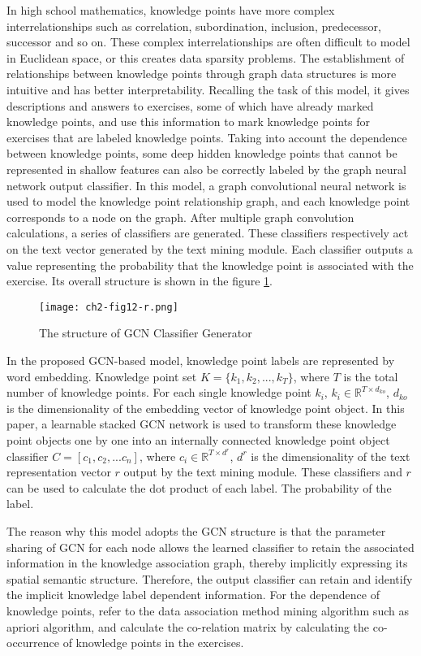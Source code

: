 In high school mathematics, knowledge points have more complex interrelationships such as correlation, subordination, inclusion, predecessor, successor and so on. These complex interrelationships are often difficult to model in Euclidean space, or this creates data sparsity problems. The establishment of relationships between knowledge points through graph data structures is more intuitive and has better interpretability. Recalling the task of this model, it gives descriptions and answers to exercises, some of which have already marked knowledge points, and use this information to mark knowledge points for exercises that are labeled knowledge points. Taking into account the dependence between knowledge points, some deep hidden knowledge points that cannot be represented in shallow features can also be correctly labeled by the graph neural network output classifier. In this model, a graph convolutional neural network is used to model the knowledge point relationship graph, and each knowledge point corresponds to a node on the graph. After multiple graph convolution calculations, a series of classifiers are generated. These classifiers respectively act on the text vector generated by the text mining module. Each classifier outputs a value representing the probability that the knowledge point is associated with the exercise. Its overall structure is shown in the figure \ref{fig:ch2-fig12}.

\begin{figure}[h]
	\centering
	\texttt{[image: ch2-fig12-r.png]}
	\caption{The structure of GCN Classifier Generator}
	\label{fig:ch2-fig12}
\end{figure}

In the proposed GCN-based model, knowledge point labels are represented by word embedding. Knowledge point set $K=\{k_1,k_2,...,k_T\}$, where $T$ is the total number of knowledge points. For each single knowledge point $k_i$, $k_i \in \mathbb{R}^{T\times d_{ko}}$, $d_{ko}$ is the dimensionality of the embedding vector of knowledge point object. In this paper, a learnable stacked GCN network is used to transform these knowledge point objects one by one into an internally connected knowledge point object classifier $C=[c_1,c_2,...c_n]$, where $c_i\in\mathbb {R}^{T\times d^r}$, $d^r$ is the dimensionality of the text representation vector $r$ output by the text mining module. These classifiers and $r$ can be used to calculate the dot product of each label. The probability of the label.

The reason why this model adopts the GCN structure is that the parameter sharing of GCN for each node allows the learned classifier to retain the associated information in the knowledge association graph, thereby implicitly expressing its spatial semantic structure. Therefore, the output classifier can retain and identify the implicit knowledge label dependent information. For the dependence of knowledge points, refer to the data association method mining algorithm such as apriori algorithm, and calculate the co-relation matrix by calculating the co-occurrence of knowledge points in the exercises.

